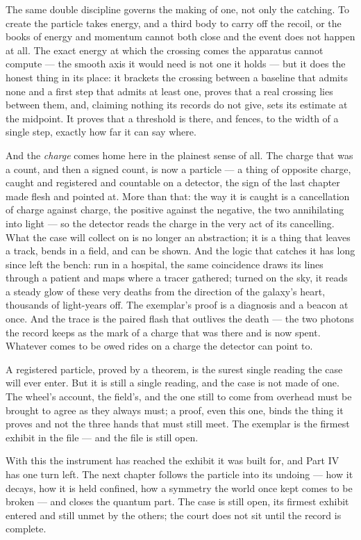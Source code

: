 The same double discipline governs the making of one, not only the catching. To create the particle takes
energy, and a third body to carry off the recoil, or the books of energy and momentum cannot both close and the
event does not happen at all. The exact energy at which the crossing comes the apparatus cannot compute --- the
smooth axis it would need is not one it holds --- but it does the honest thing in its place: it brackets the
crossing between a baseline that admits none and a first step that admits at least one, proves that a real
crossing lies between them, and, claiming nothing its records do not give, sets its estimate at the midpoint. It
proves that a threshold is there, and fences, to the width of a single step, exactly how far it can say where.

And the \emph{charge} comes home here in the plainest sense of all. The charge that was a count, and then a
signed count, is now a particle --- a thing of opposite charge, caught and registered and countable on a
detector, the sign of the last chapter made flesh and pointed at. More than that: the way it is caught is a
cancellation of charge against charge, the positive against the negative, the two annihilating into light --- so
the detector reads the charge in the very act of its cancelling. What the case will collect on is no longer an
abstraction; it is a thing that leaves a track, bends in a field, and can be shown. And the logic that catches
it has long since left the bench: run in a hospital, the same coincidence draws its lines through a patient and
maps where a tracer gathered; turned on the sky, it reads a steady glow of these very deaths from the direction
of the galaxy's heart, thousands of light-years off. The exemplar's proof is a diagnosis and a beacon at once. And the trace is the paired
flash that outlives the death --- the two photons the record keeps as the mark of a charge that was there and is
now spent. Whatever comes to be owed rides on a charge the detector can point to.

A registered particle, proved by a theorem, is the surest single reading the case will ever enter. But it is
still a single reading, and the case is not made of one. The wheel's account, the field's, and the one still to
come from overhead must be brought to agree as they always must; a proof, even this one, binds the thing it
proves and not the three hands that must still meet. The exemplar is the firmest exhibit in the file --- and the
file is still open.

With this the instrument has reached the exhibit it was built for, and Part IV has one turn left. The next
chapter follows the particle into its undoing --- how it decays, how it is held confined, how a symmetry the
world once kept comes to be broken --- and closes the quantum part. The case is still open, its firmest exhibit
entered and still unmet by the others; the court does not sit until the record is complete.

